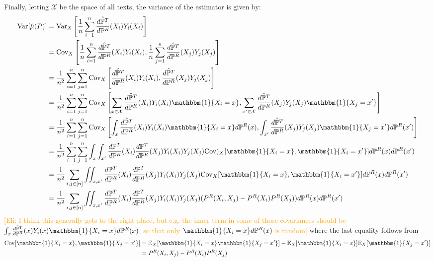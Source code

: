 \documentclass{article}
\newcommand{\eli}[1]{\textcolor{orange}{[Eli: #1]}}
\begin{document}
Finally, letting $\mathcal{X}$ be the space of all texts, the variance of the estimator is given by:
\begin{align*}
    \text{Var}[\hat{\mu}(P)] &= \text{Var}_X\left[\frac{1}{n} \sum_{i=1}^n \frac{\hat{d \mathbb{P}^T}}{d \mathbb{P}^R}(X_i)Y_i(X_i)\right] \\
    &= \text{Cov}_X\left[\frac{1}{n} \sum_{i=1}^n \frac{\hat{d \mathbb{P}^T}}{d \mathbb{P}^R}(X_i)Y_i(X_i), \frac{1}{n} \sum_{j=1}^n \frac{\hat{d \mathbb{P}^T}}{d \mathbb{P}^R}(X_j)Y_j(X_j)\right] \\
    &= \frac{1}{n^2}\sum_{i=1}^n \sum_{j=1}^n \text{Cov}_X\left[\frac{\hat{d \mathbb{P}^T}}{d \mathbb{P}^R}(X_i)Y_i(X_i), \frac{\hat{d \mathbb{P}^T}}{d \mathbb{P}^R}(X_j)Y_j(X_j)\right] \\
    &= \frac{1}{n^2}\sum_{i=1}^n \sum_{j=1}^n \text{Cov}_X\left[\sum_{x \in \mathcal{X}}\frac{\hat{d \mathbb{P}^T}}{d \mathbb{P}^R}(X_i)Y_i(X_i)\mathbbm{1}\{X_i = x\}, \sum_{x' \in \mathcal{X}}\frac{\hat{d \mathbb{P}^T}}{d \mathbb{P}^R}(X_j)Y_j(X_j)\mathbbm{1}\{X_j=x'\}\right] \\
    &= \frac{1}{n^2}\sum_{i=1}^n \sum_{j=1}^n \text{Cov}_X\left[\int_x\frac{\hat{d \mathbb{P}^T}}{d \mathbb{P}^R}(X_i)Y_i(X_i)\mathbbm{1}\{X_i = x\}d\mathbb{P}^R(x), \int_{x'}\frac{\hat{d \mathbb{P}^T}}{d \mathbb{P}^R}(X_j)Y_j(X_j)\mathbbm{1}\{X_j=x'\}d\mathbb{P}^R(x')\right] \\
    &= \frac{1}{n^2} \sum_{i=1}^n \sum_{j=1}^n \int_x \int_{x'} \frac{d \mathbb{P}^T}{d \mathbb{P}^R}(X_i)\frac{d \mathbb{P}^T}{d \mathbb{P}^R}(X_j)Y_i(X_i)Y_j(X_j) \text{Cov})_X[\mathbbm{1}\{X_i=x\}, \mathbbm{1}\{X_i=x'\}]d\mathbb{P}^R(x)d\mathbb{P}^R(x') \\
    &= \frac{1}{n^2} \sum_{i,j \in [n]} \iint_{x, x'} \frac{d \mathbb{P}^T}{d \mathbb{P}^R}(X_i)\frac{d \mathbb{P}^T}{d \mathbb{P}^R}(X_j)Y_i(X_i)Y_j(X_j) \text{Cov}_X[\mathbbm{1}\{X_i=x\}, \mathbbm{1}\{X_i=x'\}]d\mathbb{P}^R(x)d\mathbb{P}^R(x') \\
    &= \frac{1}{n^2} \sum_{i,j \in [n]} \iint_{x, x'} \frac{d \mathbb{P}^T}{d \mathbb{P}^R}(X_i)\frac{d \mathbb{P}^T}{d \mathbb{P}^R}(X_j)Y_i(X_i)Y_j(X_j) (P^R(X_i,X_j) - P^R(X_i)P^R(X_j))d\mathbb{P}^R(x)d\mathbb{P}^R(x')
\end{align*}
\eli{I think this generally gets to the right place, but e.g. the inner term in some of those covariances should be $\int_x\frac{\hat{d \mathbb{P}^T}}{d \mathbb{P}^R}(x)Y_i(x)\mathbbm{1}\{X_i = x\}d\mathbb{P}^R(x)$, so that only $\mathbbm{1}\{X_i = x\}d\mathbb{P}^R(x)$ is random}
where the last equality follows from
\begin{align*}
    \text{Cov}[\mathbbm{1}\{X_i=x\},\mathbbm{1}\{X_j=x'\}] &=\mathbb{E}_X[\mathbbm{1}\{X_i=x\}\mathbbm{1}\{X_j=x'\}] - \mathbb{E}_X[\mathbbm{1}\{X_i=x\}]\mathbb{E}_X[\mathbbm{1}\{X_j=x'\}] \\
    &= P^R(X_i,X_j) - P^R(X_i)P^R(X_j)
\end{align*}
\end{document}
